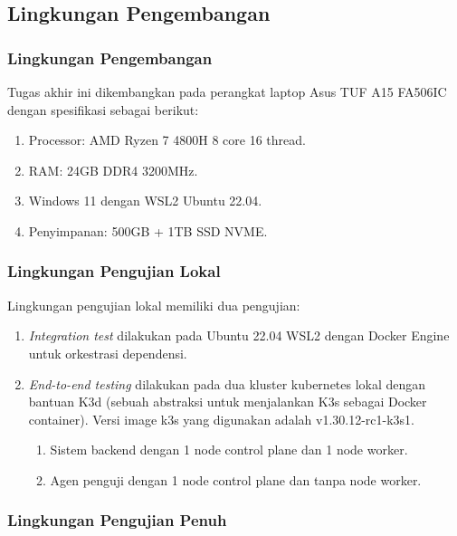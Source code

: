 \subsection{Lingkungan Pengembangan}

\subsubsection{Lingkungan Pengembangan}

Tugas akhir ini dikembangkan pada perangkat laptop Asus TUF A15 FA506IC dengan spesifikasi sebagai berikut:

\begin{enumerate}
    \item Processor: AMD Ryzen 7 4800H 8 core 16 thread.
    \item RAM: 24GB DDR4 3200MHz.
    \item Windows 11 dengan WSL2 Ubuntu 22.04.
    \item Penyimpanan: 500GB + 1TB SSD NVME.
\end{enumerate}

\subsubsection{Lingkungan Pengujian Lokal}

Lingkungan pengujian lokal memiliki dua pengujian:

\begin{enumerate}
    \item \textit{Integration test} dilakukan pada Ubuntu 22.04 WSL2 dengan Docker Engine untuk orkestrasi dependensi.
    \item \textit{End-to-end testing} dilakukan pada dua kluster kubernetes lokal dengan bantuan K3d (sebuah abstraksi untuk menjalankan K3s sebagai Docker container). Versi image k3s yang digunakan adalah v1.30.12-rc1-k3s1.
          \begin{enumerate}
              \item Sistem backend dengan 1 node control plane dan 1 node worker.
              \item Agen penguji dengan 1 node control plane dan tanpa node worker.
          \end{enumerate}
\end{enumerate}

\subsubsection{Lingkungan Pengujian Penuh}

